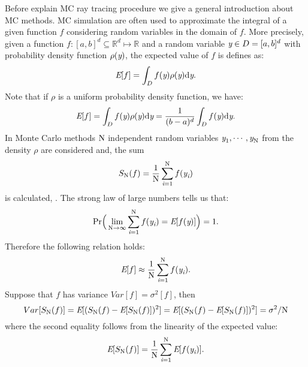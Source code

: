 Before explain MC ray tracing procedure we give a general introduction about MC methods. MC simulation are often used to approximate the integral of a given function $f$ considering random variables in the domain of $f$. More precisely, given a function $f:[a,b]^d\subseteq \mathbb{R}^d \mapsto \mathbb{R}$ and a random variable $\textit{y}\in D = [a, b]^d$ with probability density function $\rho(\textit{y})$, the expected value of $f$ is defines as:
\begin{equation}
\textit{E}[f] =\int_{D}f(\textit{y})\rho(\textit{y}) \textrm{d}\textit{y}.
\end{equation}
Note that if $\rho$ is a uniform probability density function, we have:
\begin{equation}
\textit{E}[f] = \int_{D}f(\textit{y})\rho(\textit{y}) \textrm{d}\textit{y} =\frac{1}{(b-a)^d} \int_{D}f(\textit{y}) \textrm{d}\textit{y}.
\end{equation}
In Monte Carlo methods $\textrm{N}$ independent random variables  $\textit{y}_1, \cdots, \textit{y}_{\textrm{N}}$  from the density $\rho$ are considered and, the sum 
\begin{equation}
S_{\textrm{N}}(f) = \frac{1}{\textrm{N}} \sum_{\textit{i}=1}^{\textrm{N}} f(\textit{y}_{\textit{i}})
\end{equation}
is calculated,  \cite{owen2003quasi}. 
The strong law of large numbers tells us that:
\begin{equation}
\textrm{Pr}\Big(\lim_{\textrm{N}\rightarrow\infty}\sum_{\textit{i}=1}^{\textrm{N}} f(\textit{y}_{\textit{i}}) = \textit{E}[f(\textit{y})] \Big) = 1.
\end{equation}
Therefore the following relation holds:
\begin{equation}
\textit{E}[f] \approx \frac{1}{\textrm{N}} \sum_{\textit{i}=1}^{\textrm{N}} f(\textit{y}_{\textit{i}}).
\end{equation}
Suppose that $f$ has variance $Var[f]=\sigma^2[f] $, then 
\begin{equation}
Var[S_{\textrm{N}}(f)] = \textit{E}[(S_{\textrm{N}}(f)-\textit{E}[S_{\textrm{N}}(f)])^2]= \textit{E}[(S_{\textrm{N}}(f)-\textit{E}[S_{\textrm{N}}(f)])^2] = \sigma^2/\textrm{N}
\end{equation}
where the second equality follows from the linearity of the expected value:
\begin{equation}
\textit{E}[S_{\textrm{N}}(f)] = \frac{1}{\textrm{N}}\sum_{\textit{i}=1}^{\textrm{N}}\textit{E}[ f(\textit{y}_{\textit{i}})].
\end{equation}
